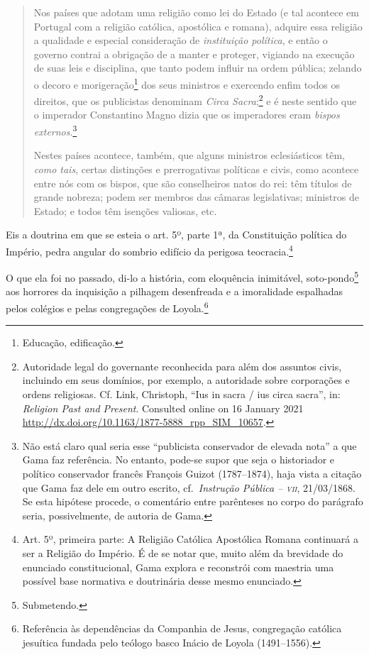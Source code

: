 \begin{quote}
Nos países que adotam uma religião como lei do Estado (e tal acontece
em Portugal com a religião católica, apostólica e romana), adquire essa
religião a qualidade e especial consideração de \emph{instituição
política}, e então o governo contrai a obrigação de a manter e proteger,
vigiando na execução de suas leis e disciplina, que tanto podem influir
na ordem pública; zelando o decoro e morigeração\footnote{Educação,
  edificação.} dos seus ministros e exercendo enfim todos os direitos,
que os publicistas denominam \emph{Circa Sacra};\footnote{Autoridade
  legal do governante reconhecida para além dos assuntos civis,
  incluindo em seus domínios, por exemplo, a autoridade sobre
  corporações e ordens religiosas. Cf. Link, Christoph, ``Ius in sacra /
  ius circa sacra'', in: \emph{Religion Past and Present}. Consulted
  online on 16 January 2021
  \url{http://dx.doi.org/10.1163/1877-5888_rpp_SIM_10657}.} e é neste
sentido que o imperador Constantino Magno dizia que os imperadores eram
\emph{bispos externos}.\footnote{Não está claro qual seria esse
  ``publicista conservador de elevada nota'' a que Gama faz referência. No
  entanto, pode-se supor que seja o historiador e político conservador
  francês François Guizot (1787--1874), haja vista a citação que Gama
  faz dele em outro escrito, cf.~\emph{Instrução Pública -- \textsc{vii}},
  21/03/1868. Se esta hipótese procede, o comentário entre parênteses no
  corpo do parágrafo seria, possivelmente, de autoria de Gama.}

Nestes países acontece, também, que alguns ministros eclesiásticos têm,
\emph{como tais}, certas distinções e prerrogativas políticas e civis,
como acontece entre nós com os bispos, que são conselheiros natos do
rei: têm títulos de grande nobreza; podem ser membros das câmaras
legislativas; ministros de Estado; e todos têm isenções valiosas, etc.
\end{quote}

Eis a doutrina em que se esteia o art. 5º, parte 1ª, da Constituição
política do Império, pedra angular do sombrio edifício da perigosa
teocracia.\footnote{Art. 5º, primeira parte: A Religião Católica
  Apostólica Romana continuará a ser a Religião do Império. É de se
  notar que, muito além da brevidade do enunciado constitucional, Gama
  explora e reconstrói com maestria uma possível base normativa e
  doutrinária desse mesmo enunciado.}

O que ela foi no passado, di-lo a história, com eloquência inimitável,
soto-pondo\footnote{Submetendo.} aos horrores da inquisição a pilhagem
desenfreada e a imoralidade espalhadas pelos colégios e pelas
congregações de Loyola.\footnote{Referência às dependências da
  Companhia de Jesus, congregação católica jesuítica fundada pelo
  teólogo basco Inácio de Loyola (1491--1556).}

